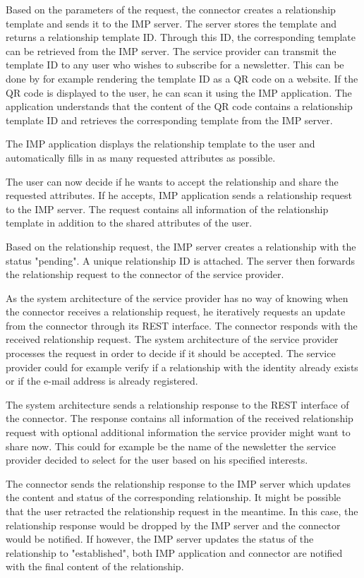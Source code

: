 Based on the parameters of the request, the connector creates a relationship template and sends it to the IMP server. The server stores the template and returns a relationship template ID. Through this ID, the corresponding template can be retrieved from the IMP server.
The service provider can transmit the template ID to any user who wishes to subscribe for a newsletter. This can be done by for example rendering the template ID as a QR code on a website.
If the QR code is displayed to the user, he can scan it using the IMP application. The application understands that the content of the QR code contains a relationship template ID and retrieves the corresponding template from the IMP server.

The IMP application displays the relationship template to the user and automatically fills in as many requested attributes as possible.

The user can now decide if he wants to accept the relationship and share the requested attributes. If he accepts, IMP application sends a relationship request to the IMP server. The request contains all information of the relationship template in addition to the shared attributes of the user.

Based on the relationship request, the IMP server creates a relationship with the status "pending". A unique relationship ID is attached. The server then forwards the relationship request to the connector of the service provider.

As the system architecture of the service provider has no way of knowing when the connector receives a relationship request, he iteratively requests an update from the connector through its REST interface. The connector responds with the received relationship request. The system architecture of the service provider processes the request in order to decide if it should be accepted. The service provider could for example verify if a relationship with the identity already exists or if the e-mail address is already registered.

The system architecture sends a relationship response to the REST interface of the connector. The response contains all information of the received relationship request with optional additional information the service provider might want to share now. This could for example be the name of the newsletter the service provider decided to select for the user based on his specified interests.

The connector sends the relationship response to the IMP server which updates the content and status of the corresponding relationship. It might be possible that the user retracted the relationship request in the meantime. In this case, the relationship response would be dropped by the IMP server and the connector would be notified.
If however, the IMP server updates the status of the relationship to "established", both IMP application and connector are notified with the final content of the relationship.

